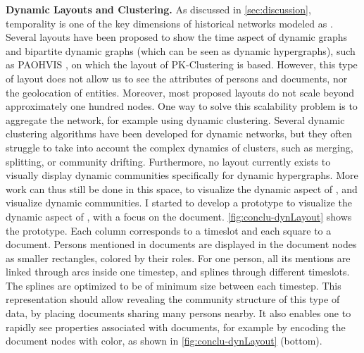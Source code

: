 \noindent\textbf{Dynamic Layouts and Clustering.} As discussed in \autoref{sec:discussion}, temporality is one of the key dimensions of historical networks modeled as \modelplural.
Several layouts have been proposed to show the time aspect of dynamic graphs\cite{brandesAsymmetricRelationsLongitudinal2011, bachVisualizingDynamicNetworks2014} and bipartite dynamic graphs (which can be seen as dynamic hypergraphs), such as PAOHVIS \cite{valdiviaAnalyzingDynamicHypergraphs2021}, on which the layout of PK-Clustering is based.
However, this type of layout does not allow us to see the attributes of persons and documents, nor the geolocation of entities.
Moreover, most proposed layouts do not scale beyond approximately one hundred nodes.
One way to solve this scalability problem is to aggregate the network, for example using dynamic clustering.
Several dynamic clustering algorithms have been developed for dynamic networks, but they often struggle to take into account the complex dynamics of clusters, such as merging, splitting, or community drifting.
Furthermore, no layout currently exists to visually display dynamic communities specifically for dynamic hypergraphs.
More work can thus still be done in this space, to visualize the dynamic aspect of \modelplural, and visualize dynamic communities.
I started to develop a prototype to visualize the dynamic aspect of \modelplural, with a focus on the document.
\autoref{fig:conclu-dynLayout} shows the prototype.
Each column corresponds to a timeslot and each square to a document.
Persons mentioned in documents are displayed in the document nodes as smaller rectangles, colored by their roles.
For one person, all its mentions are linked through arcs inside one timestep, and splines through different timeslots.
The splines are optimized to be of minimum size between each timestep.
This representation should allow revealing the community structure of this type of data, by placing documents sharing many persons nearby.
It also enables one to rapidly see properties associated with documents, for example by encoding the document nodes with color, as shown in \autoref{fig:conclu-dynLayout} (bottom).

